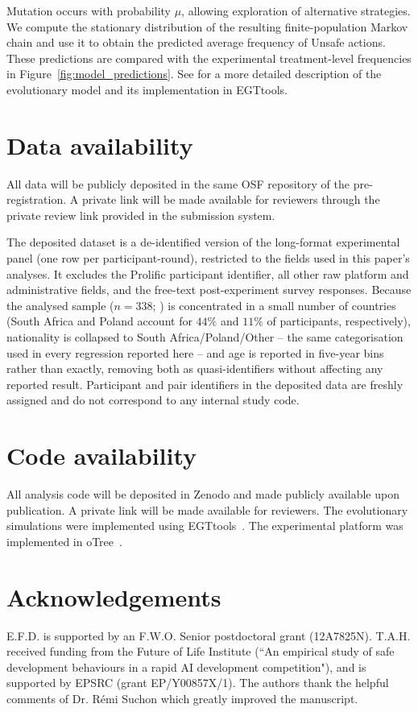 \documentclass[pdflatex,sn-mathphys-ay]{sn-jnl}
\theoremstyle{thmstyleone}
\theoremstyle{thmstyletwo}
\theoremstyle{thmstylethree}
\begin{document}
Mutation occurs with probability \(\mu\), allowing exploration of alternative strategies. We compute the stationary distribution of the resulting finite-population Markov chain and use it to obtain the predicted average frequency of Unsafe actions. These predictions are compared with the experimental treatment-level frequencies in Figure~\ref{fig:model_predictions}. See \cite{domingos2023egttools} for a more detailed description of the evolutionary model and its implementation in EGTtools.

\section*{Data availability}

All data will be publicly deposited in the same OSF repository of the pre-registration. A private link will be made available for reviewers through the private review link provided in the submission system.

The deposited dataset is a de-identified version of the long-format experimental panel (one row per participant-round), restricted to the fields used in this paper's analyses. It excludes the Prolific participant identifier, all other raw platform and administrative fields, and the free-text post-experiment survey responses. Because the analysed sample ($n=338$; ) is concentrated in a small number of countries (South Africa and Poland account for \(44\%\) and \(11\%\) of participants, respectively), nationality is collapsed to South Africa/Poland/Other -- the same categorisation used in every regression reported here -- and age is reported in five-year bins rather than exactly, removing both as quasi-identifiers without affecting any reported result. Participant and pair identifiers in the deposited data are freshly assigned and do not correspond to any internal study code.

\section*{Code availability}

All analysis code will be deposited in Zenodo and made publicly available upon publication. A private link will be made available for reviewers. The evolutionary simulations were implemented using EGTtools~\citep{domingos2023egttools}. The experimental platform was implemented in oTree~\citep{chen2016otree}.

\section*{Acknowledgements}
E.F.D. is supported by an F.W.O. Senior postdoctoral grant (12A7825N). T.A.H. received funding from the Future of Life Institute (``An empirical study of safe development behaviours in a rapid AI development competition"), and is supported by EPSRC (grant EP/Y00857X/1). The authors thank the helpful comments of Dr. Rémi Suchon which greatly improved the manuscript.
\end{document}
